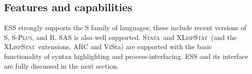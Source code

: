 \documentclass{article}
\newcommand*{\SAS}{\textsc{SAS}{\textregistered} }
\newcommand*{\Splus}{\textsc{S-Plus}}
\newcommand*{\XLispStat}{\textsc{XLispStat}}
\newcommand*{\Stata}{\textsc{Stata}}
\newcommand{\stexttt}[1]{{\small\texttt{#1}}}
\begin{document}





\subsection{Features and capabilities}
\label{sec:ESS:features}

ESS strongly supports the S family of languages; these include recent
versions of S, \Splus, and R.  \SAS is also well supported.  \Stata\ 
and \XLispStat\ (and the \XLispStat\ extensions, ARC and ViSta) are
supported with the basic functionality of syntax highlighting and
process-interfacing.  ESS and its interface are fully discussed in the
next section.
\end{document}
